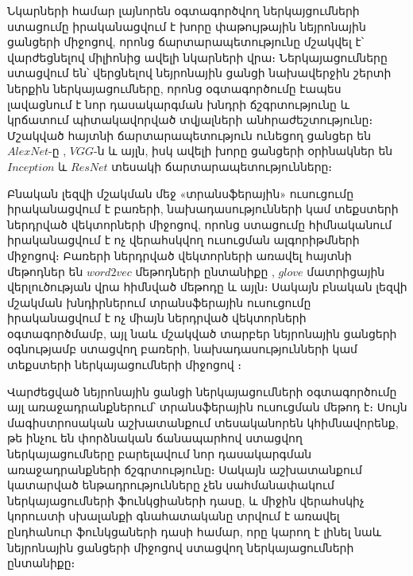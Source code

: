 \documentclass[12pt]{article}
\begin{document}
\par Նկարների համար լայնորեն օգտագործվող ներկայցումների ստացումը իրականացվում է խորը փաթույթային  նեյրոնային ցանցերի միջոցով,  որոնց ճարտարապետությունը մշակվել է՝ վարժեցնելով միլիոնից ավելի նկարների վրա։ Ներկայացումները ստացվում են՝ վերցնելով նեյրոնային ցանցի նախավերջին շերտի ներքին ներկայացումները, որոնց օգտագործումը էապես լավացնում է նոր դասակարգման խնդրի ճշգրտությունը և կրճատում պիտակավորված տվյալների անհրաժեշտությունը։  Մշակված հայտնի ճարտարապետություն ունեցող  ցանցեր են $AlexNet$-ը \cite{bib_item_15}, $VGG$-ն \cite{bib_item_4} և այլն,  իսկ ավելի խորը ցանցերի օրինակներ են $Inception$ \cite{bib_item_16} և $ResNet$ \cite{bib_item_5} տեսակի ճարտարապետությունները։

Բնական լեզվի մշակման մեջ «տրանսֆերային» ուսուցումը իրականացվում է բառերի, նախադասությունների կամ տեքստերի ներդրված վեկտորների միջոցով, որոնց ստացումը հիմնականում իրականացվում է  ոչ վերահսկվող ուսուցման ալգորիթմների միջոցով։ Բառերի ներդրված վեկտորների առավել հայտնի մեթոդներ են $word2vec$  մեթոդների ընտանիքը \cite{bib_item_18}, $glove$ մատրիցային վերլուծության վրա հիմնված մեթոդը \cite{bib_item_17} և այլն։ Սակայն բնական լեզվի մշակման խնդիրներում տրանսֆերային ուսուցումը իրականացվում է ոչ միայն ներդրված վեկտորների օգտագործմամբ, այլ նաև մշակված տարբեր նեյրոնային ցանցերի օգնությամբ ստացվող բառերի, նախադասությունների կամ տեքստերի ներկայացումների միջոցով \cite{bib_item_19, bib_item_6}։
\par Վարժեցված նեյրոնային ցանցի ներկայացումների օգտագործումը այլ առաջադրանքներում՝ տրանսֆերային ուսուցման մեթոդ է։ Սույն մագիստրոսական աշխատանքում տեսականորեն կհիմնավորենք, թե ինչու են փորձնական ճանապարհով ստացվող ներկայացումները բարելավում նոր դասակարգման առաջադրանքների ճշգրտությունը։ Սակայն աշխատանքում կատարված ենթադրությունները չեն սահմանափակում ներկայացումների ֆունկցիաների դասը, և միջին վերահսկիչ կորուստի սխալանքի գնահատականը տրվում է առավել ընդհանուր ֆունկցաների դասի համար, որը կարող է լինել նաև նեյրոնային ցանցերի միջոցով ստացվող ներկայացումների ընտանիքը։
\end{document}
